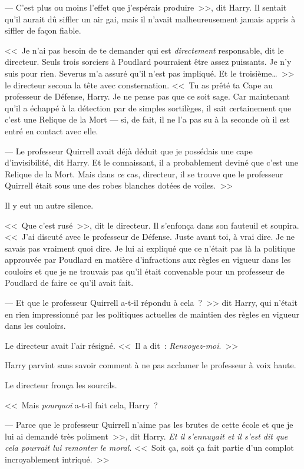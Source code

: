 --- C'est plus ou moins l'effet que j'espérais produire~>>, dit Harry. Il sentait qu'il aurait dû siffler un air gai, mais il n'avait malheureusement jamais appris à siffler de façon fiable.

<<~Je n'ai pas besoin de te demander qui est \emph{directement} responsable, dit le directeur. Seuls trois sorciers à Poudlard pourraient être assez puissants. Je n'y suis pour rien. Severus m'a assuré qu'il n'est pas impliqué. Et le troisième…~>> le directeur secoua la tête avec consternation. <<~Tu as prêté ta Cape au professeur de Défense, Harry. Je ne pense pas que ce soit sage. Car maintenant qu'il a échappé à la détection par de simples sortilèges, il sait certainement que c'est une Relique de la Mort — si, de fait, il ne l'a pas su à la seconde où il est entré en contact avec elle.

--- Le professeur Quirrell avait déjà déduit que je possédais une cape d'invisibilité, dit Harry. Et le connaissant, il a probablement deviné que c'est une Relique de la Mort. Mais dans \emph{ce} cas, directeur, il se trouve que le professeur Quirrell était sous une des robes blanches dotées de voiles.~>>

Il y eut un autre silence.

<<~Que c'est rusé~>>, dit le directeur. Il s'enfonça dans son fauteuil et soupira. <<~J'ai discuté avec le professeur de Défense. Juste avant toi, à vrai dire. Je ne savais pas vraiment quoi dire. Je lui ai expliqué que ce n'était pas là la politique approuvée par Poudlard en matière d'infractions aux règles en vigueur dans les couloirs et que je ne trouvais pas qu'il était convenable pour un professeur de Poudlard de faire ce qu'il avait fait.

--- Et que le professeur Quirrell a-t-il répondu à cela~?~>> dit Harry, qui n'était en rien impressionné par les politiques actuelles de maintien des règles en vigueur dans les couloirs.

Le directeur avait l'air résigné. <<~Il a dit~: \emph{Renvoyez-moi}.~>>

Harry parvint sans savoir comment à ne pas acclamer le professeur à voix haute.

Le directeur fronça les sourcils.

<<~Mais \emph{pourquoi} a-t-il fait cela, Harry~?

--- Parce que le professeur Quirrell n'aime pas les brutes de cette école et que je lui ai demandé très poliment~>>, dit Harry. \emph{Et il s'ennuyait et il s'est dit que cela pourrait lui remonter le moral.} <<~Soit ça, soit ça fait partie d'un complot incroyablement intriqué.~>>

